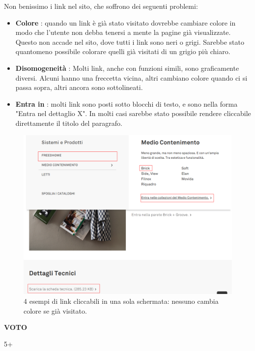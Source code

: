 Non benissimo i link nel sito, che soffrono dei seguenti problemi:
\begin{itemize}
	\item \textbf{Colore} : quando un link è già stato visitato dovrebbe cambiare colore in modo che l'utente non debba tenersi a mente la pagine già visualizzate. Questo non accade nel sito, dove tutti i link sono neri o grigi. Sarebbe stato quantomeno possibile colorare quelli già visitati di un grigio più chiaro.
	\item \textbf{Disomogeneità} : Molti link, anche con funzioni simili, sono graficamente diversi. Alcuni hanno una freccetta vicina, altri cambiano colore quando ci si passa sopra, altri ancora sono sottolineati.
	\item \textbf{Entra in} : molti link sono posti sotto blocchi di testo, e sono nella forma "Entra nel dettaglio X". In molti casi sarebbe stato possibile rendere cliccabile direttamente il titolo del paragrafo.
\end{itemize}

\begin{figure}[H]
	\centering
	\includegraphics[width=\textwidth ,keepaspectratio]{sez/Elementi_Comuni/img/link.png}
	\caption{4 esempi di link cliccabili in una sola schermata: nessuno cambia colore se già visitato.}
\end{figure}

\begin{center}
\begin{Large}
\textbf{VOTO}\\
\vspace{0.1cm}
\end{Large}
\begin{huge}
5+
\end{huge}
\end{center}